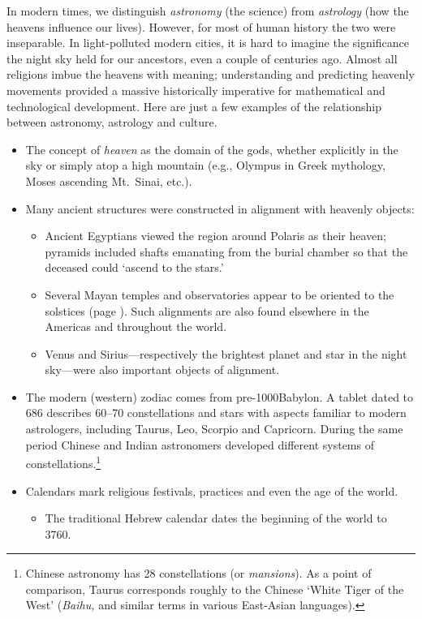 In modern times, we distinguish \emph{astronomy} (the science) from \emph{astrology} (how the heavens influence our lives). However, for most of human history the two were inseparable. In light-polluted modern cities, it is hard to imagine the significance the night sky held for our ancestors, even a couple of centuries ago. Almost all religions imbue the heavens with meaning; understanding and predicting heavenly movements provided a massive historically imperative for mathematical and technological development. Here are just a few examples of the relationship between astronomy, astrology and culture.
\begin{itemize}\itemsep0pt
	\item The concept of \emph{heaven} as the domain of the gods, whether explicitly in the sky or simply atop a high mountain (e.g., Olympus in Greek mythology, Moses ascending Mt.\ Sinai, etc.).
	\item Many ancient structures were constructed in alignment with heavenly objects:
	\begin{itemize}
	  \item Ancient Egyptians viewed the region around Polaris as their heaven; pyramids included shafts emanating from the burial chamber so that the deceased could `ascend to the stars.' 
		\item Several Mayan temples and observatories appear to be oriented to the solstices (page \pageref{ssec:astro1}). Such alignments are also found elsewhere in the Americas and throughout the world.
		\item Venus and Sirius---respectively the brightest planet and star in the night sky---were also important objects of alignment.
	\end{itemize}
	\item The modern (western) zodiac comes from pre-1000\BC Babylon. A tablet dated to 686\BC{} describes 60--70 constellations and stars with aspects familiar to modern astrologers, including Taurus, Leo, Scorpio and Capricorn. During the same period Chinese and Indian astronomers developed different systems of constellations.\footnote{%
	Chinese astronomy has 28 constellations (or \emph{mansions}). As a point of comparison, Taurus corresponds roughly to the Chinese `White Tiger of the West' (\emph{Baihu,} and similar terms in various East-Asian languages).%
}
	\item Calendars mark religious festivals, practices and even the age of the world.
	\begin{itemize}
	  \item The traditional Hebrew calendar dates the beginning of the world to 3760\BC.

\end{itemize}
\end{itemize}
